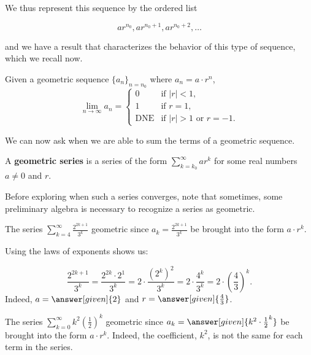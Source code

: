 \documentclass{ximera}
\begin{document}
We thus represent this sequence by the ordered list

\[
ar^{n_0} , ar^{n_0+1}, ar^{n_0+2}, \ldots
\]

and we have a result that characterizes the behavior of this type of sequence, which we recall now.


\begin{theorem}
  Given a geometric sequence $\{a_n\}_{n=n_0}$ where $a_n = a \cdot r^{n}$,
  \[
  \lim_{n\to\infty} a_n =
  \begin{cases}
    0 &\text{if $|r|<1$,}\\
    1 &\text{if $r=1$,}\\
    \text{DNE} &\text{if $|r|>1$ or $r=-1$.}
  \end{cases}
  \]
\end{theorem}

We can now ask when we are able to sum the terms of a geometric sequence.

\begin{definition}
  A \textbf{geometric series} is a series of the form $\sum_{k=k_0}^\infty ar^k$
  for some real numbers $a \ne 0$ and $r$.
\end{definition}

Before exploring when such a series converges, note that sometimes, some preliminary algebra is necessary to recognize a series as geometric.

\begin{example}
The series $\sum_{k=4}^\infty \frac{2^{2k+1}}{3^k}$  geometric since $a_k =\frac{2^{2k+1}}{3^k}$  be brought into the form $a \cdot r^k$.  

Using the laws of exponents shows us:

\[
\frac{2^{2k+1}}{3^k} = \frac{2^{2k} \cdot 2^1}{3^k}= 2 \cdot \frac{\left(2^{k}\right)^2}{3^k} = 2 \cdot \frac{4^k}{3^k} = 2 \cdot \left(\frac{4}{3}\right)^k.
\]
Indeed, $a= \answer[given]{2}$ and $r = \answer[given]{\frac{4}{3}}$.
\end{example}

\begin{example}
The series $\sum_{k=0}^\infty k^2 \left(\frac{1}{2}\right)^k$  geometric since $a_k = \answer[given]{k^2 \cdot \frac{1}{2}^k}$  be brought into the form $a \cdot r^k$.  Indeed, the coefficient, $k^2$, is not the same for each term in the series.
\end{example}
\end{document}
